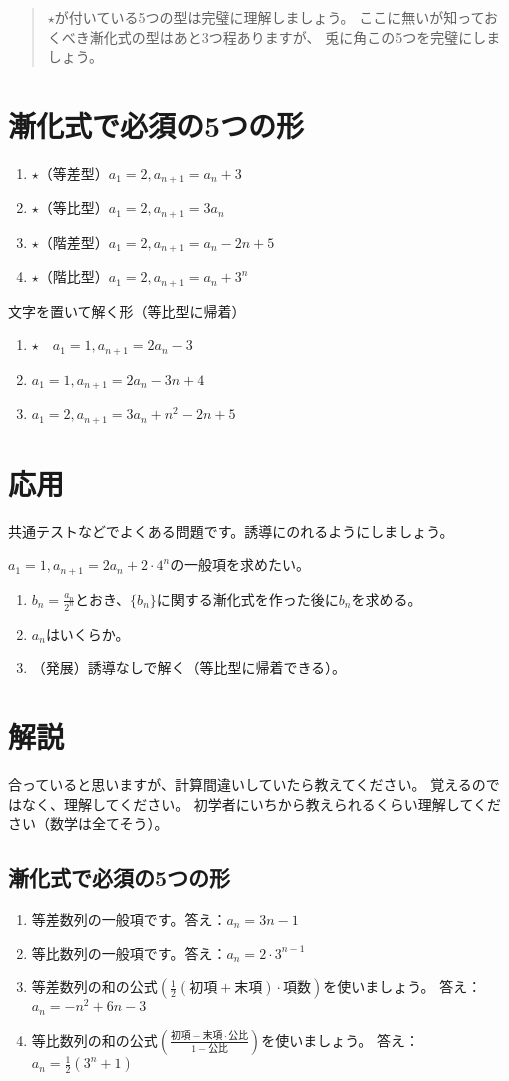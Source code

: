 \documentclass[12pt,a4paper]{jsarticle}
\begin{document}
\begin{abstract}
    $\star$が付いている5つの型は完璧に理解しましょう。
    ここに無いが知っておくべき漸化式の型はあと3つ程ありますが、
    兎に角この5つを完璧にしましょう。
\end{abstract}
\section{漸化式で必須の5つの形}
\begin{enumerate}
    \item $\star$（等差型）$a_1=2, a_{n+1}=a_n +3$
    \item $\star$（等比型）$a_1=2, a_{n+1}=3 a_n$
    \item $\star$（階差型）$a_1=2, a_{n+1}=a_n -2n+5$
    \item $\star$（階比型）$a_1=2, a_{n+1}=a_n +3^n$
\end{enumerate}
文字を置いて解く形（等比型に帰着）
\begin{enumerate}
    \item $\star \quad a_1=1, a_{n+1}=2 a_n -3$
    \item $a_1=1, a_{n+1}=2 a_n -3n+4$
    \item $a_1=2, a_{n+1}=3a_n+n^2 -2n +5$
\end{enumerate}
\section{応用}
共通テストなどでよくある問題です。誘導にのれるようにしましょう。

$a_1=1,a_{n+1}=2a_{n}+2\cdot 4^n$の一般項を求めたい。
\begin{enumerate}
    \item $b_n=\frac{a_n}{2^n}$とおき、$\{b_n\}$に関する漸化式を作った後に$b_n$を求める。
    \item $a_n$はいくらか。
    \item （発展）誘導なしで解く（等比型に帰着できる）。
\end{enumerate}
\newpage
\section{解説}
合っていると思いますが、計算間違いしていたら教えてください。
覚えるのではなく、理解してください。
初学者にいちから教えられるくらい理解してください（数学は全てそう）。
\subsection{漸化式で必須の5つの形}
\begin{enumerate}
    \item  等差数列の一般項です。答え：$a_n= 3n-1$
    \item 等比数列の一般項です。答え：$a_n=2\cdot 3^{n-1} $
    \item 等差数列の和の公式$\left(\frac{1}{2}(初項+末項)\cdot 項数\right)$を使いましょう。
    答え：$a_n=-n^2+6n-3$
    \item 等比数列の和の公式$\left(\frac{初項-末項\cdot 公比}{1-公比}\right)$を使いましょう。
    答え：$a_n=\frac{1}{2}(3^n+1)$
\end{enumerate}
\end{document}
